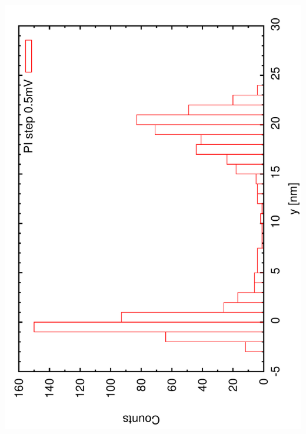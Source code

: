 \documentclass[a4paper,11pt]{book}
\begin{document}
\includegraphics[angle=-90,scale=0.20]{imagestep01a.pdf}\\
\end{document}
